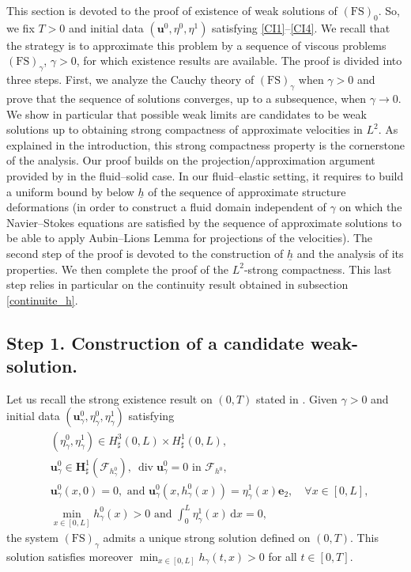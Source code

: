 \documentclass[10pt]{amsart}
\let\mathcal\mathscr
\newcommand{\FS}{\mathrm{FS}}
\theoremstyle{remark}
\theoremstyle{definition}
\newcommand{\ug}{\boldsymbol{u}}
\newcommand{\dd}{\,\mathrm{d}}
\DeclareMathOperator{\DIV}{div}
\newcommand{\BS}[1]{\boldsymbol{#1}}
\newcommand{\hb}{{\underline{h}}}
\begin{document}
This section is devoted to the proof of existence of weak solutions of $(\FS)_0$.
So, we fix $T>0$ and initial data $(\ug^0,\eta^0,\eta^1)$ satisfying \eqref{CI1}--\eqref{CI4}.
We recall that the strategy is to approximate this problem by a sequence of viscous problems $(\FS)_\gamma$, $\gamma>0$, for which existence results are available. The proof is divided into three steps. First, we analyze the Cauchy theory of $(\FS)_{\gamma}$ when $\gamma >0$ and prove that the sequence of solutions converges, up to a subsequence, when $\gamma \to 0$. We show in particular that possible weak limits are candidates to be weak solutions up to obtaining
strong compactness of approximate velocities in $L^2$. As explained in the introduction, this strong compactness property is the cornerstone of the analysis. Our proof builds on the projection/approximation argument provided by \cite{SanMartin-Starovoitov-Tucsnak}
in the fluid--solid case. In our fluid--elastic setting, it requires to build a uniform bound by below $\hb$ of the sequence
of approximate structure deformations (in order to construct a fluid domain independent of $\gamma$ on which the Navier--Stokes equations are satisfied by the sequence of approximate solutions to be able to apply Aubin--Lions Lemma for projections of the velocities). The second step of the proof is devoted to the construction of $\hb$ and
the analysis of its properties. We then complete the proof of the $L^2$-strong compactness. This last step relies in particular on the continuity result obtained in subsection \ref{continuite_h}.

\subsection{Step 1. Construction of a candidate weak-solution.}
\label{sec:proof1}
Let us recall the strong existence result on $(0,T)$ stated in \cite[Th.\,1]{Grandmont-Hillairet}.
Given $\gamma>0$ and initial data $(\ug_\gamma^{0},\eta_\gamma^{0},\eta_\gamma^{1})$ satisfying
\begin{align}
&(\eta_\gamma^{0},\eta_\gamma^{1})\in H^{3}_{\sharp}(0,L)\times H^{1}_{\sharp}(0,L),\label{CI-gamma1}\\
&\ug_\gamma^{0}\in \BS{H}_{\sharp}^{1}(\mathcal{F}_{h_{\gamma}^{0}}),\ \DIV{\ug_\gamma^{0}}=0\text{ in }\mathcal{F}_{h^{0}},\label{CI-gamma2}\\
&\ug_\gamma^{0}(x,0)=0, \text{ and }\ug_\gamma^{0}(x,h_\gamma^{0}(x))=\eta_\gamma^{1}(x)\BS{e}_{2},\quad \forall x\in [0,L],\label{CI-gamma3}\\
&\min_{x\in[0,L]}h_\gamma^{0}(x)>0\text{ and }\int_{0}^{L}\eta_\gamma^{1}(x)\dd x=0,\label{CI-gamma4}
\end{align}
the system $(\FS)_{\gamma}$ admits a unique strong solution defined on $(0, T)$. This solution satisfies moreover $\min_{x\in [0, L]} h_\gamma(t,x) >0$ for all $t\in [0, T]$.
\end{document}
